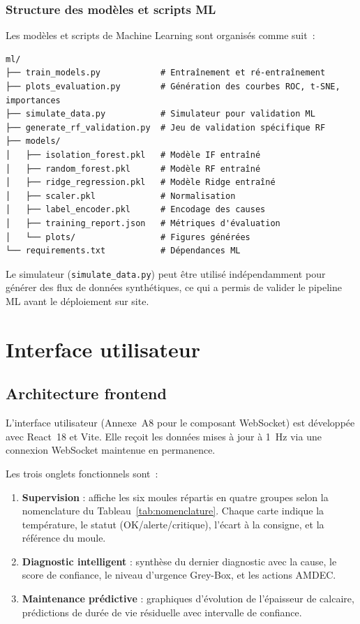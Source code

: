 \subsubsection{Structure des modèles et scripts ML}

Les modèles et scripts de Machine Learning sont organisés comme suit~:

\begin{center}
\begin{minipage}{0.70\textwidth}
\begin{verbatim}
ml/
├── train_models.py            # Entraînement et ré-entraînement
├── plots_evaluation.py        # Génération des courbes ROC, t-SNE, importances
├── simulate_data.py           # Simulateur pour validation ML
├── generate_rf_validation.py  # Jeu de validation spécifique RF
├── models/
│   ├── isolation_forest.pkl   # Modèle IF entraîné
│   ├── random_forest.pkl      # Modèle RF entraîné
│   ├── ridge_regression.pkl   # Modèle Ridge entraîné
│   ├── scaler.pkl             # Normalisation
│   ├── label_encoder.pkl      # Encodage des causes
│   ├── training_report.json   # Métriques d'évaluation
│   └── plots/                 # Figures générées
└── requirements.txt           # Dépendances ML
\end{verbatim}
\end{minipage}
\end{center}

Le simulateur (\texttt{simulate\_data.py}) peut être utilisé indépendamment pour générer des flux de données synthétiques, ce qui a permis de valider le pipeline ML avant le déploiement sur site.

\section{Interface utilisateur}

\subsection{Architecture frontend}

L'interface utilisateur (Annexe~A8 pour le composant WebSocket) est développée avec React~18 et Vite. Elle reçoit les données mises à jour à 1~Hz via une connexion WebSocket maintenue en permanence.

Les trois onglets fonctionnels sont~:

\begin{enumerate}
  \item \textbf{Supervision} : affiche les six moules répartis en quatre groupes selon la nomenclature du Tableau~\ref{tab:nomenclature}. Chaque carte indique la température, le statut (OK/alerte/critique), l'écart à la consigne, et la référence du moule.
  \item \textbf{Diagnostic intelligent} : synthèse du dernier diagnostic avec la cause, le score de confiance, le niveau d'urgence Grey-Box, et les actions AMDEC.
  \item \textbf{Maintenance prédictive} : graphiques d'évolution de l'épaisseur de calcaire, prédictions de durée de vie résiduelle avec intervalle de confiance.
\end{enumerate}

